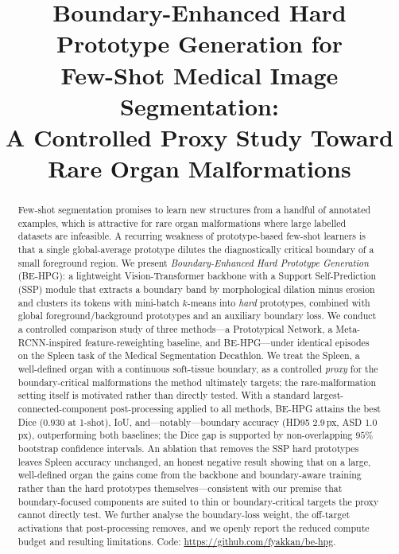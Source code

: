 \documentclass[conference]{IEEEtran}
\newcommand{\repourl}{https://github.com/fyakkan/be-hpg}
\begin{document}
\title{Boundary-Enhanced Hard Prototype Generation for\\
Few-Shot Medical Image Segmentation:\\
A Controlled Proxy Study Toward Rare Organ Malformations}

\author{
}

\maketitle

\begin{abstract}
Few-shot segmentation promises to learn new structures from a handful of annotated examples,
which is attractive for rare organ malformations where large labelled datasets are infeasible.
A recurring weakness of prototype-based few-shot learners is that a single global-average
prototype dilutes the diagnostically critical boundary of a small foreground region. We present
\emph{Boundary-Enhanced Hard Prototype Generation} (BE-HPG): a lightweight Vision-Transformer
backbone with a Support Self-Prediction (SSP) module that extracts a boundary band by
morphological dilation minus erosion and clusters its tokens with mini-batch $k$-means into
\emph{hard} prototypes, combined with global foreground/background prototypes and an auxiliary
boundary loss. We conduct a controlled comparison study of three methods---a Prototypical
Network, a Meta-RCNN-inspired feature-reweighting baseline, and BE-HPG---under identical
episodes on the Spleen task of the Medical Segmentation Decathlon. We treat the Spleen, a
well-defined organ with a continuous soft-tissue boundary, as a controlled \emph{proxy} for the
boundary-critical malformations the method ultimately targets; the rare-malformation setting
itself is motivated rather than directly tested. With a standard largest-connected-component
post-processing applied to all methods, BE-HPG attains the best Dice ($0.930$ at 1-shot), IoU,
and---notably---boundary accuracy (HD95 $2.9$\,px, ASD $1.0$\,px), outperforming both
baselines; the Dice gap is supported by non-overlapping $95\%$ bootstrap confidence intervals.
An ablation that removes the SSP hard prototypes leaves Spleen accuracy unchanged, an honest
negative result showing that on a large, well-defined organ the gains come from the backbone and
boundary-aware training rather than the hard prototypes themselves---consistent with our premise
that boundary-focused components are suited to thin or boundary-critical targets the proxy cannot
directly test. We further analyse the boundary-loss weight, the off-target activations that
post-processing removes, and we openly report the reduced compute budget and resulting
limitations. Code: \url{\repourl}.
\end{abstract}
\end{document}
